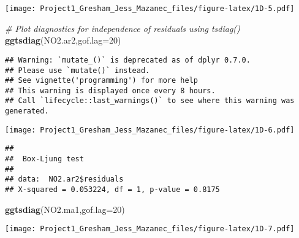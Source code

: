 \documentclass[
]{article}
\newenvironment{Shaded}{\begin{snugshade}}{\end{snugshade}}
\newcommand{\CommentTok}[1]{\textcolor[rgb]{0.56,0.35,0.01}{\textit{#1}}}
\newcommand{\DataTypeTok}[1]{\textcolor[rgb]{0.13,0.29,0.53}{#1}}
\newcommand{\DecValTok}[1]{\textcolor[rgb]{0.00,0.00,0.81}{#1}}
\newcommand{\KeywordTok}[1]{\textcolor[rgb]{0.13,0.29,0.53}{\textbf{#1}}}
\newcommand{\NormalTok}[1]{#1}
\newcommand{\OperatorTok}[1]{\textcolor[rgb]{0.81,0.36,0.00}{\textbf{#1}}}
\newcommand{\StringTok}[1]{\textcolor[rgb]{0.31,0.60,0.02}{#1}}
\begin{document}
\texttt{[image: Project1\_Gresham\_Jess\_Mazanec\_files/figure-latex/1D-5.pdf]}

\begin{Shaded}
\begin{Highlighting}[]
\CommentTok{# Plot diagnostics for independence of residuals using tsdiag()}
\KeywordTok{ggtsdiag}\NormalTok{(NO2.ar2,}\DataTypeTok{gof.lag=}\DecValTok{20}\NormalTok{)}
\end{Highlighting}
\end{Shaded}

\begin{verbatim}
## Warning: `mutate_()` is deprecated as of dplyr 0.7.0.
## Please use `mutate()` instead.
## See vignette('programming') for more help
## This warning is displayed once every 8 hours.
## Call `lifecycle::last_warnings()` to see where this warning was generated.
\end{verbatim}

\texttt{[image: Project1\_Gresham\_Jess\_Mazanec\_files/figure-latex/1D-6.pdf]}

\begin{Shaded}
\end{Shaded}

\begin{verbatim}
## 
##  Box-Ljung test
## 
## data:  NO2.ar2$residuals
## X-squared = 0.053224, df = 1, p-value = 0.8175
\end{verbatim}

\begin{Shaded}
\begin{Highlighting}[]
\KeywordTok{ggtsdiag}\NormalTok{(NO2.ma1,}\DataTypeTok{gof.lag=}\DecValTok{20}\NormalTok{)}
\end{Highlighting}
\end{Shaded}

\texttt{[image: Project1\_Gresham\_Jess\_Mazanec\_files/figure-latex/1D-7.pdf]}

\begin{Shaded}
\end{Shaded}
\end{document}
